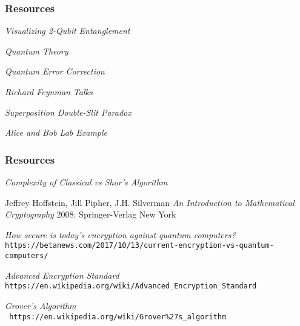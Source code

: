 \documentclass{beamer}
\begin{document}
\begin{thebibliography}{1}
  \begin{frame}
 \frametitle{Resources}
   {\em Visualizing 2-Qubit Entanglement}\\ 
  
   {\em Quantum Theory}\\
  
   {\em Quantum Error Correction}\\
  
   {\em Richard Feynman Talks}\\
  
   {\em Superposition Double-Slit Paradox}\\
  
   {\em Alice and Bob Lab Example}\\

\end{frame}

\begin{frame}
\frametitle{Resources}
   {\em Complexity of Classical vs Shor's Algorithm}\\ 
  
   Jeffrey Hoffstein, Jill Pipher, J.H. Silverman {\em An Introduction to Mathematical Cryptography} 2008: Springer-Verlag New York
  
   {\em How secure is today's encryption against quantum computers?}\\ \texttt{https://betanews.com/2017/10/13/current-encryption-vs-quantum-computers/}
  
   {\em Advanced Encryption Standard}\\ \texttt{https://en.wikipedia.org/wiki/Advanced_Encryption_Standard}
  
   {\em Grover's Algorithm}\\ \texttt{ https://en.wikipedia.org/wiki/Grover\%27s\_algorithm}
  

\end{frame}
\end{thebibliography}
\end{document}
